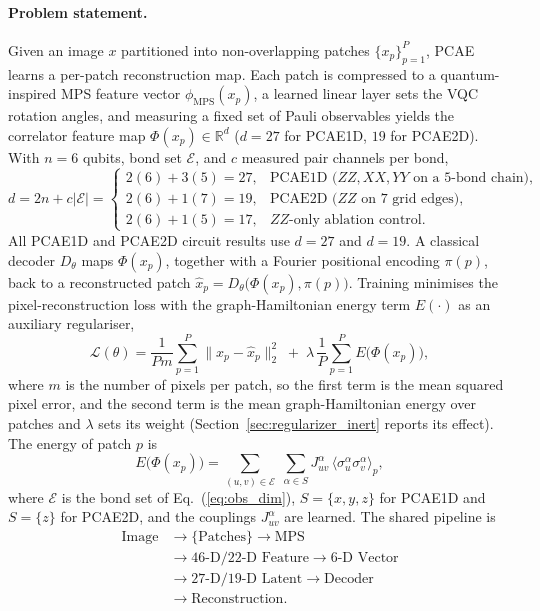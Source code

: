 \documentclass[pdflatex,sn-basic]{sn-jnl}
\begin{document}
\paragraph{Problem statement.}
Given an image $x$ partitioned into non-overlapping patches $\{x_p\}_{p=1}^{P}$, PCAE learns a per-patch reconstruction map.
Each patch is compressed to a quantum-inspired MPS feature vector $\phi_{\mathrm{MPS}}(x_p)$, a learned linear layer sets the VQC rotation angles, and measuring a fixed set of Pauli observables yields the correlator feature map $\Phi(x_p)\in\mathbb{R}^{d}$ ($d=27$ for PCAE1D, $19$ for PCAE2D).
With $n=6$ qubits, bond set $\mathcal{E}$, and $c$ measured pair channels per bond,
\begin{equation}
  \label{eq:obs_dim}
  d=2n+c\lvert\mathcal{E}\rvert=
  \begin{cases}
    2(6)+3(5)=27, & \text{PCAE1D ($ZZ,XX,YY$ on a 5-bond chain)},\\
    2(6)+1(7)=19, & \text{PCAE2D ($ZZ$ on 7 grid edges)},\\
    2(6)+1(5)=17, & \text{$ZZ$-only ablation control}.
  \end{cases}
\end{equation}
All PCAE1D and PCAE2D circuit results use $d=27$ and $d=19$.
A classical decoder $D_\theta$ maps $\Phi(x_p)$, together with a Fourier positional encoding $\pi(p)$, back to a reconstructed patch $\hat{x}_p=D_\theta\!\big(\Phi(x_p),\pi(p)\big)$.
Training minimises the pixel-reconstruction loss with the graph-Hamiltonian energy term $E(\cdot)$ as an auxiliary regulariser,
\begin{equation}
  \label{eq:objective}
  \mathcal{L}(\theta)=\frac{1}{Pm}\sum_{p=1}^{P}\big\|x_p-\hat{x}_p\big\|_2^{2}
  \;+\;\lambda\,\frac{1}{P}\sum_{p=1}^{P}E\big(\Phi(x_p)\big),
\end{equation}
where $m$ is the number of pixels per patch, so the first term is the mean squared pixel error, and the second term is the mean graph-Hamiltonian energy over patches and $\lambda$ sets its weight (Section~\ref{sec:regularizer_inert} reports its effect).
The energy of patch $p$ is
\begin{equation}
  \label{eq:energy}
  E\big(\Phi(x_p)\big)=\sum_{(u,v)\in\mathcal{E}}\;\sum_{\alpha\in S}
  J^{\alpha}_{uv}\,\langle\sigma^{\alpha}_{u}\sigma^{\alpha}_{v}\rangle_{p},
\end{equation}
where $\mathcal{E}$ is the bond set of Eq.~(\ref{eq:obs_dim}), $S=\{x,y,z\}$ for PCAE1D and $S=\{z\}$ for PCAE2D, and the couplings $J^{\alpha}_{uv}$ are learned.
The shared pipeline is
\begin{equation}
\begin{aligned}
\text{Image}
  &\rightarrow \{\text{Patches}\} \rightarrow \text{MPS}\\
  &\rightarrow \text{46-D/22-D Feature} \rightarrow \text{6-D Vector}\\
  &\rightarrow \text{27-D/19-D Latent} \rightarrow \text{Decoder}\\
  &\rightarrow \text{Reconstruction}.
\end{aligned}
\end{equation}
\end{document}
